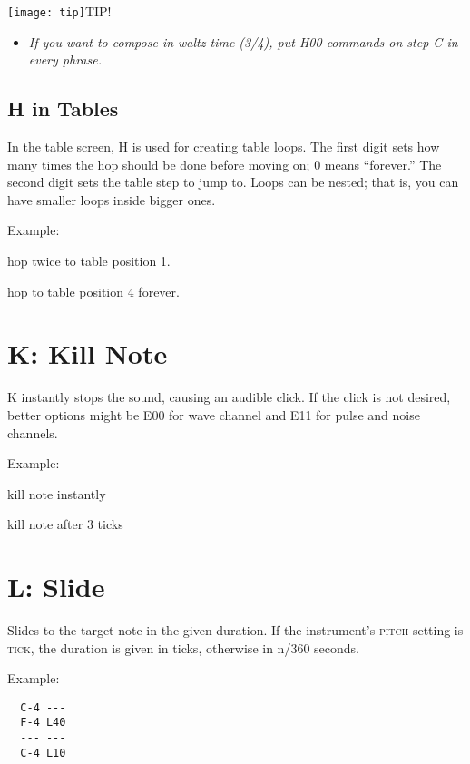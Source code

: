 \texttt{[image: tip]}TIP!
\nolinebreak
\begin{itemize}
        \item \textit{If you want to compose in waltz time (3/4), put \textsc{H00} commands on step \textsc{C} in every phrase.}
\end{itemize}

\subsection{H in Tables}

In the table screen, H is used for creating table loops. The first digit sets how many times the hop should be done before moving on; 0 means ``forever.'' The second digit sets the table step to jump to. Loops can be nested; that is, you can have smaller loops inside bigger ones.

\begin{description}
\item Example:
\item[H21] hop twice to table position 1.
\item[H04] hop to table position 4 forever.
\end{description}

\section{K: Kill Note}

K instantly stops the sound, causing an audible click. If the click is not desired, better options might be E00 for wave channel and E11 for pulse and noise channels.

\begin{description}
\item Example:
\item[K00] kill note instantly
\item[K03] kill note after 3 ticks
\end{description}

\section{L: Slide}

Slides to the target note in the given duration. If the instrument's \textsc{pitch} setting is \textsc{tick}, the duration is given in ticks, otherwise in n/360 seconds.

Example:

\begin{verbatim}
  C-4 ---
  F-4 L40
  --- ---
  C-4 L10
\end{verbatim}

